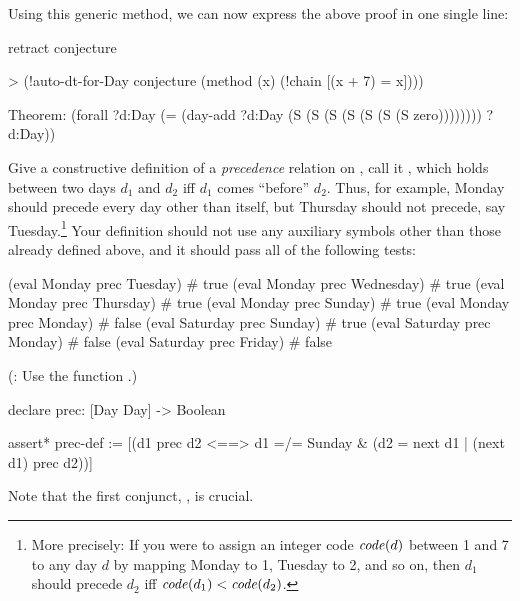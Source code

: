 Using this generic method, we can now express the above proof in one single line: 
\begin{tcAthena}
retract conjecture

> (!auto-dt-for-Day conjecture (method (x) (!chain [(x + 7) = x])))

Theorem: (forall ?d:Day
           (= (day-add ?d:Day
                       (S (S (S (S (S (S (S zero))))))))
              ?d:Day))
\end{tcAthena}

\begin{exercise}
Give a constructive definition of a {\em precedence\/} relation on , call it , 
which holds between two days $d_1$ and $d_2$ iff $d_1$ comes ``before'' $d_2$. 
Thus, for example, Monday should precede every day other than itself, but Thursday should not precede, say Tuesday.\footnote{More 
precisely: If you were to assign an integer code $\mbox{\em code\/}(d)$ between 1 and 7 to any day $d$ by mapping Monday to 1, 
Tuesday to 2, and so on, then $d_1$ should precede $d_2$ iff $\mbox{\em code\/}(d_1) < \mbox{\em code\/}(d_2)$.}
Your definition should not use any auxiliary symbols other than those already defined above, and it should
pass all of the following tests: 
\begin{tcAthena}
(eval Monday prec Tuesday)    # true
(eval Monday prec Wednesday)  # true
(eval Monday prec Thursday)   # true 
(eval Monday prec Sunday)     # true
(eval Monday prec Monday)     # false 
(eval Saturday prec Sunday)   # true 
(eval Saturday prec Monday)   # false 
(eval Saturday prec Friday)   # false 
\end{tcAthena}
(: Use the function .)
\end{exercise}
\begin{solution}[print=false]
\begin{tcAthena}
declare prec: [Day Day] -> Boolean

assert* prec-def := [(d1 prec d2 <==> 
                     d1 =/= Sunday & (d2 = next d1 | (next d1) prec d2))]
\end{tcAthena}
Note that the first conjunct, , is crucial. 
\end{solution}

